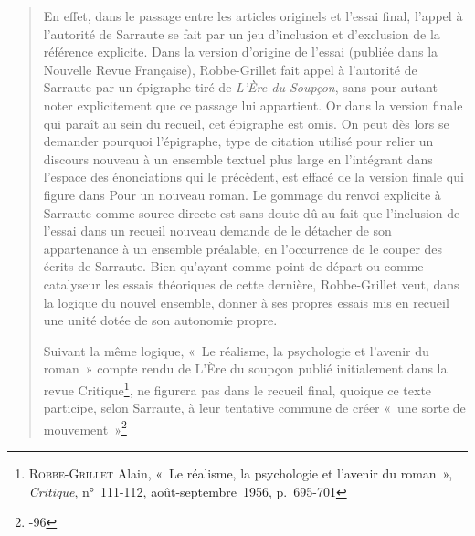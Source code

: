 \documentclass[12pt, a4paper]{article}
\begin{document}
\begin{quote}
    En effet, dans le passage entre les articles originels et l’essai final, l’appel à l’autorité de Sarraute se fait par un jeu d’inclusion et d’exclusion de la référence explicite. Dans la version d’origine de l’essai (publiée dans la Nouvelle Revue Française), Robbe-Grillet fait appel à l’autorité de Sarraute par un épigraphe tiré de \textit{L’Ère du Soupçon}, sans pour autant noter explicitement que ce passage lui appartient. Or dans la version finale qui paraît au sein du recueil, cet épigraphe est omis. On peut dès lors se demander pourquoi l’épigraphe, type de citation utilisé pour relier un discours nouveau à un ensemble textuel plus large en l’intégrant dans l’espace des énonciations qui le précèdent, est effacé de la version finale qui figure dans Pour un nouveau roman. Le gommage du renvoi explicite à Sarraute comme source directe est sans doute dû au fait que l’inclusion de l’essai dans un recueil nouveau demande de le détacher de son appartenance à un ensemble préalable, en l’occurrence de le couper des écrits de Sarraute. Bien qu’ayant comme point de départ ou comme catalyseur les essais théoriques de cette dernière, Robbe-Grillet veut, dans la logique du nouvel ensemble, donner à ses propres essais mis en recueil une unité dotée de son autonomie propre.
    
    Suivant la même logique, «~Le réalisme, la psychologie et l’avenir du roman~» compte rendu de L’Ère du soupçon publié initialement dans la revue Critique\footnote{\textsc{Robbe-Grillet} Alain, «~Le réalisme, la psychologie et l’avenir du roman~», \textit{Critique}, n°~111-112, août-septembre~1956, p.~695-701}, ne figurera pas dans le recueil final, quoique ce texte participe, selon Sarraute, à leur tentative commune de créer «~une sorte de mouvement~»\footnote{-96}
\end{quote}

\end{document}

